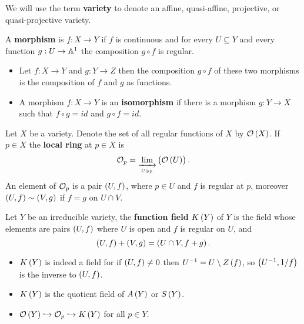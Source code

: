 \begin{definition}
We will use the term \textbf{variety} to denote an affine, quasi-affine, projective, or quasi-projective variety.
\end{definition}

\begin{definition}
A \textbf{morphism} is $ f : X \to Y $ if $ f $ is continuous and for every $ U \subseteq Y $ and every function $ g : U \to \mathbb{A}^1 $ the composition $ g \circ f $ is regular.
\end{definition}

\begin{remark}
\hfill
\begin{itemize}
\item Let $ f : X \to Y $ and $ g : Y \to Z $ then the composition $ g \circ f $ of these two morphisms is the composition of $ f $ and $ g $ as functions.
\item A morphism $ f : X \to Y $ is an \textbf{isomorphism} if there is a morphism $ g : Y \to X $ such that $ f \circ g = id $ and $ g \circ f = id $.
\end{itemize}
\end{remark}

\begin{definition}
Let $ X $ be a variety. Denote the set of all regular functions of $ X $ by $ \OO\br{X} $. If $ p \in X $ the \textbf{local ring} at $ p \in X $ is
$$ \OO_p = \lim_{\xrightarrow[U \ni p]{}}\br{\OO\br{U}}. $$
An element of $ \mathcal{O}_p $ is a pair $ \br{U, f} $, where $ p \in U $ and $ f $ is regular at $ p $, moreover $ \br{U, f} \sim \br{V, g} $ if $ f = g $ on $ U \cap V $.
\end{definition}

\pagebreak


\begin{definition}
Let $ Y $ be an irreducible variety, the \textbf{function field} $ K\br{Y} $ of $ Y $ is the field whose elements are pairs $ \br{U, f} $ where $ U $ is open and $ f $ is regular on $ U $, and
$$ \br{U, f} + \br{V, g} = \br{U \cap V, f + g}. $$
\end{definition}

\begin{remark}
\hfill
\begin{itemize}
\item $ K\br{Y} $ is indeed a field for if $ \br{U, f} \ne 0 $ then $ U^{-1} = U \setminus Z\br{f} $, so $ \br{U^{-1}, 1 / f} $ is the inverse to $ \br{U, f} $.
\item $ K\br{Y} $ is the quotient field of $ A\br{Y} $ or $ S\br{Y} $.
\item $ \OO\br{Y} \hookrightarrow \OO_p \hookrightarrow K\br{Y} $ for all $ p \in Y $.
\end{itemize}
\end{remark}

